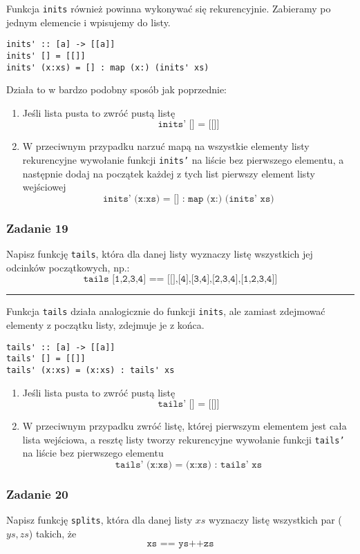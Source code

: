 \documentclass[11pt,a4paper]{article}
\begin{document}
Funkcja \texttt{inits} również powinna wykonywać się rekurencyjnie. Zabieramy po jednym elemencie i wpisujemy do listy.
\begin{Verbatim}[frame=single]
inits' :: [a] -> [[a]]
inits' [] = [[]]
inits' (x:xs) = [] : map (x:) (inits' xs)
\end{Verbatim}
Działa to w bardzo podobny sposób jak poprzednie:
\begin{enumerate}
    \item Jeśli lista pusta to zwróć pustą listę
        \[
            \texttt{inits' [] = [[]]}
        \]
    \item W przeciwnym przypadku narzuć mapą na wszystkie elementy listy rekurencyjne wywołanie funkcji \texttt{inits'} na liście bez pierwszego elementu, a następnie dodaj na początek każdej z tych list pierwszy element listy wejściowej
        \[
            \texttt{inits' (x:xs) = [] : map (x:) (inits' xs)}
        \]
\end{enumerate}

\subsubsection{Zadanie 19}
Napisz funkcję \texttt{tails}, która dla danej listy wyznaczy listę wszystkich jej odcinków początkowych, np.:
\[
    \texttt{tails [1,2,3,4] == [[],[4],[3,4],[2,3,4],[1,2,3,4]]}
\]

\bigskip
\hrule
\bigskip

Funkcja \texttt{tails} działa analogicznie do funkcji \texttt{inits}, ale zamiast zdejmować elementy z początku listy, zdejmuje je z końca.
\begin{Verbatim}[frame=single]
tails' :: [a] -> [[a]]
tails' [] = [[]]
tails' (x:xs) = (x:xs) : tails' xs
\end{Verbatim}
\begin{enumerate}
    \item Jeśli lista pusta to zwróć pustą listę
        \[
            \texttt{tails' [] = [[]]}
        \]
    \item W przeciwnym przypadku zwróć listę, której pierwszym elementem jest cała lista wejściowa, a resztę listy tworzy rekurencyjne wywołanie funkcji \texttt{tails'} na liście bez pierwszego elementu
        \[
            \texttt{tails' (x:xs) = (x:xs) : tails' xs}
        \]
\end{enumerate}

\subsubsection{Zadanie 20}
Napisz funkcję \texttt{splits}, która dla danej listy $xs$ wyznaczy listę wszystkich par ($ys,zs$) takich, że
\[
    \texttt{xs == ys++zs}
\]
\end{document}
